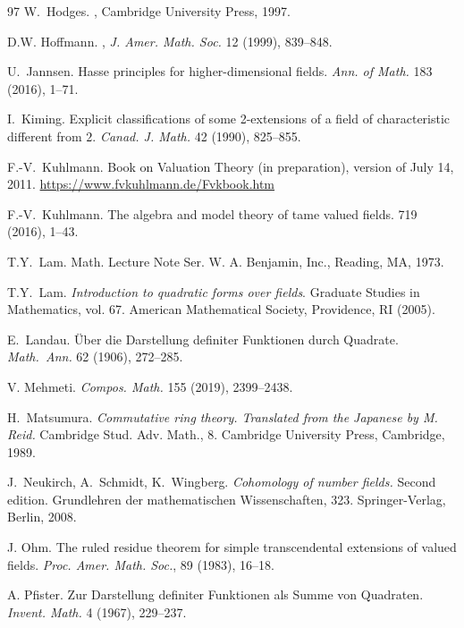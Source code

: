 \documentclass[12pt,leqno]{amsart}
\numberwithin{equation}{section}
\theoremstyle{definition}
\theoremstyle{plain}
\begin{document}
\begin{thebibliography}{97}
W.~Hodges.
,
Cambridge University Press, 1997.

D.W. Hoffmann. , \emph{J. Amer. Math. Soc.} 12 (1999), 839--848.

U.~Jannsen.
Hasse principles for higher-dimensional fields. 
{\em Ann. of Math.} 183 (2016), 1--71.

I.~Kiming.
Explicit classifications of some 2-extensions of a field of characteristic different from $2$.
\emph{Canad. J. Math.} 42 (1990),  825--855.

F.-V.~Kuhlmann.
Book on Valuation Theory (in preparation), version of July 14, 2011.
\url{https://www.fvkuhlmann.de/Fvkbook.htm}

F.-V.~Kuhlmann. The algebra and model theory of tame valued fields. 
 {719} (2016), 1--43.

T.Y.~Lam. 
Math. Lecture Note Ser.
W. A. Benjamin, Inc., Reading, MA, 1973.

T.Y.~Lam. 
\newblock 
{\em Introduction to quadratic forms over fields}. 
\newblock Graduate Studies in Mathematics, vol. 67. American Mathematical Society, Providence, RI (2005).

E.~Landau. 
\newblock Über die Darstellung definiter Funktionen durch Quadrate.
{\em Math.~Ann.} 62 (1906), 272--285.

V. Mehmeti.
{\em Compos. Math.} 155 (2019), 2399--2438.

H.~Matsumura.
\newblock 
{\em Commutative ring theory.
Translated from the Japanese by M. Reid.} 
Cambridge Stud. Adv. Math., 8.
Cambridge University Press, Cambridge, 1989.

J.~Neukirch, A.~Schmidt, K.~Wingberg. 
{\em Cohomology of number fields.} Second edition. Grundlehren der mathematischen Wissenschaften, 323. Springer-Verlag, Berlin, 2008.

J. Ohm.
The ruled residue theorem for simple transcendental extensions of valued fields.
{\em Proc. Amer. Math. Soc.}, 89 (1983), 16--18.

A. Pfister.
Zur Darstellung definiter Funktionen als Summe von Quadraten.
{\em Invent. Math.} 4 (1967), 229--237.


\end{thebibliography}
\end{document}

